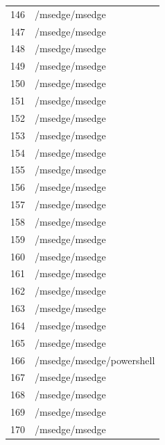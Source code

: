 \documentclass[a4paper,twoside,12pt]{book}
\begin{document}
\begin{appendices}
\begin{table}
	\centering
	\begin{tabular}{ll}
		\toprule
		146 &                                     /msedge/msedge \\
		147 &                                     /msedge/msedge \\
		148 &                                     /msedge/msedge \\
		149 &                                     /msedge/msedge \\
		150 &                                     /msedge/msedge \\
		151 &                                     /msedge/msedge \\
		152 &                                     /msedge/msedge \\
		153 &                                     /msedge/msedge \\
		154 &                                     /msedge/msedge \\
		155 &                                     /msedge/msedge \\
		156 &                                     /msedge/msedge \\
		157 &                                     /msedge/msedge \\
		158 &                                     /msedge/msedge \\
		159 &                                     /msedge/msedge \\
		160 &                                     /msedge/msedge \\
		161 &                                     /msedge/msedge \\
		162 &                                     /msedge/msedge \\
		163 &                                     /msedge/msedge \\
		164 &                                     /msedge/msedge \\
		165 &                                     /msedge/msedge \\
		166 &                          /msedge/msedge/powershell \\
		167 &                                     /msedge/msedge \\
		168 &                                     /msedge/msedge \\
		169 &                                     /msedge/msedge \\
		170 &                                     /msedge/msedge \\

\end{tabular}
\end{table}
\end{appendices}
\end{document}

